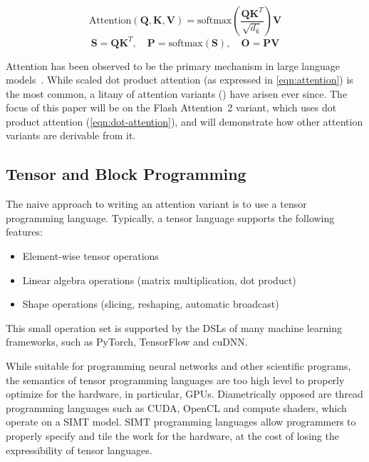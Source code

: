 \documentclass[review, anonymous, sigplan]{acmart}
\begin{document}
\begin{equation}
  \label{eqn:attention}
  \text{Attention}(\mathbf{Q}, \mathbf{K}, \mathbf{V}) = \text{softmax}(\frac{\mathbf{Q} \mathbf{K}^T}{\sqrt{d_k}}) \mathbf{V}
\end{equation}
\begin{equation}
  \label{eqn:dot-attention}
  \mathbf{S} = \mathbf{Q} \mathbf{K}^T, \quad \mathbf{P} = \text{softmax}(\mathbf{S}), \quad \mathbf{O} = \mathbf{P} \mathbf{V}
\end{equation}

Attention has been observed to be the primary mechanism in large language models~\cite{vaswani_attention_2023}. While scaled dot product attention (as expressed in \autoref{eqn:attention}) is the most common, a litany of attention variants (\cite{dao_flashattention_2022, dao_flashattention-2_2023}) have arisen ever since. The focus of this paper will be on the Flash Attention~2 \cite{dao_flashattention-2_2023} variant, which uses dot product attention (\autoref{eqn:dot-attention}), and will demonstrate how other attention variants are derivable from it.

\subsection{Tensor and Block Programming}

The naive approach to writing an attention variant is to use a tensor programming language. Typically, a tensor language supports the following features:
\begin{itemize}
  \item Element-wise tensor operations
  \item Linear algebra operations (matrix multiplication, dot product)
  \item Shape operations (slicing, reshaping, automatic broadcast)
\end{itemize}
This small operation set is supported by the DSLs of many machine learning frameworks, such as PyTorch, TensorFlow and cuDNN.

While suitable for programming neural networks and other scientific programs, the semantics of tensor programming languages are too high level to properly optimize for the hardware, in particular, GPUs. Diametrically opposed are thread programming languages such as CUDA, OpenCL and compute shaders, which operate on a SIMT model. SIMT programming languages allow programmers to properly specify and tile the work for the hardware, at the cost of losing the expressibility of tensor languages. 
\end{document}
